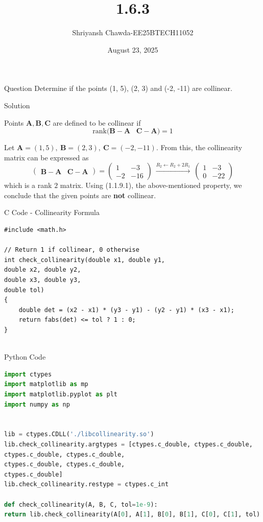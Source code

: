 \documentclass{beamer}
\title{1.6.3}
\author{Shriyansh Chawda-EE25BTECH11052}
\date{August 23, 2025}
\begin{document}
	

		\frame{\titlepage}
	
	
	

	\begin{frame}{Question} 
			Determine if the points (1, 5), (2, 3) and (-2, -11) are collinear.
	\end{frame}
	
	

	\begin{frame}{Solution}

Points $\mathbf{A}, \mathbf{B}, \mathbf{C}$ are defined to be collinear if
\[ \text{rank}\big(\mathbf{B}-\mathbf{A} \;\;\; \mathbf{C}-\mathbf{A}\big) = 1 \tag{1.1.9.1}\]
	
	Let $\mathbf{A}=(1,5),\ \mathbf{B}=(2,3),\ \mathbf{C}=(-2,-11)$.
	From this, the collinearity matrix can be expressed as
	\[
	\left(
	\begin{array}{cc}
		\mathbf{B}-\mathbf{A} & \mathbf{C}-\mathbf{A}
	\end{array}
	\right)
	=
	\begin{pmatrix}
		1 & -3\\
		-2 & -16
	\end{pmatrix}
	\ \overset{R_2\leftarrow R_2+2R_1}{\longrightarrow}\
	\begin{pmatrix}
		1 & -3\\
		0 & -22
	\end{pmatrix}
	\]
	which is a rank $2$ matrix. Using (1.1.9.1), the above-mentioned property,
	we conclude that the given points are \textbf{not} collinear.
	
	\end{frame}

\begin{frame}[fragile]{C Code - Collinearity Formula}
	\begin{lstlisting}
#include <math.h>

// Return 1 if collinear, 0 otherwise
int check_collinearity(double x1, double y1,
double x2, double y2,
double x3, double y3,
double tol)
{
	double det = (x2 - x1) * (y3 - y1) - (y2 - y1) * (x3 - x1);
	return fabs(det) <= tol ? 1 : 0;
}
	
	\end{lstlisting}
\end{frame}

\begin{frame}{Python Code}
	\begin{lstlisting}[language=Python]
import ctypes
import matplotlib as mp
import matplotlib.pyplot as plt
import numpy as np


lib = ctypes.CDLL('./libcollinearity.so')
lib.check_collinearity.argtypes = [ctypes.c_double, ctypes.c_double,
ctypes.c_double, ctypes.c_double,
ctypes.c_double, ctypes.c_double,
ctypes.c_double]
lib.check_collinearity.restype = ctypes.c_int

def check_collinearity(A, B, C, tol=1e-9):
return lib.check_collinearity(A[0], A[1], B[0], B[1], C[0], C[1], tol)

	\end{lstlisting}
\end{frame}
\end{document}
